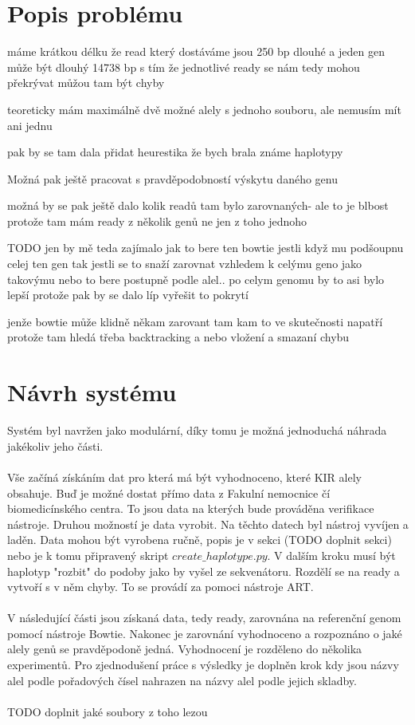 \documentclass[czech,DP]{thesiskiv}
\numberwithin{equation}{section}
\begin{document}
\section{Popis problému}
máme krátkou délku
že read který dostáváme jsou 250 bp dlouhé a jeden gen může být dlouhý 14738 bp
s tím že jednotlivé ready se nám tedy mohou překrývat
můžou tam být chyby

teoreticky mám maximálně dvě možné alely s jednoho souboru, ale nemusím mít ani jednu 

pak by se tam dala přidat heurestika že bych brala známe haplotypy

Možná pak ještě pracovat s pravděpodobností výskytu daného genu

možná by se pak ještě dalo kolik readů tam bylo zarovnaných- ale to je blbost protože tam mám ready z několik genů ne jen z toho jednoho 

TODO jen by mě teda zajímalo jak to bere ten bowtie jestli když mu podšoupnu celej ten gen tak jestli se to snaží zarovnat vzhledem k celýmu geno jako takovýmu nebo to bere postupně podle alel.. 
po celym genomu by to asi bylo lepší protože pak by se dalo líp vyřešit to pokrytí 

jenže bowtie může klidně někam zarovant tam kam to ve skutečnosti napatří protože tam hledá třeba backtracking a nebo vložení a smazaní chybu



\section{Návrh systému}
Systém byl navržen jako modulární, díky tomu je možná jednoduchá náhrada jakékoliv jeho části.
\\
\\ 
Vše začíná získáním dat pro která má být vyhodnoceno, které KIR alely obsahuje. Buď je možné dostat přímo data z Fakulní nemocnice čí biomedicínského centra. To jsou data na kterých bude prováděna verifikace nástroje. Druhou možností je data vyrobit. Na těchto datech byl nástroj vyvíjen a laděn. Data mohou být vyrobena ručně, popis je v sekci (TODO doplnit sekci) nebo je k tomu připravený skript $create\_haplotype.py$. V dalším kroku musí být haplotyp "rozbit" do podoby jako by vyšel ze sekvenátoru. Rozdělí se na ready a vytvoří s v něm chyby. To se provádí za pomoci nástroje ART.
\\
\\
V následující části jsou získaná data, tedy ready, zarovnána na referenční genom pomocí nástroje Bowtie. Nakonec je zarovnání vyhodnoceno a rozpoznáno o jaké alely genů se pravděpodoně jedná. Vyhodnocení je rozděleno do několika experimentů. Pro zjednodušení práce s výsledky je doplněn krok kdy jsou názvy alel podle pořadových čísel nahrazen na názvy alel podle jejich skladby.
\\
\\
TODO doplnit jaké soubory z toho lezou
\end{document}
